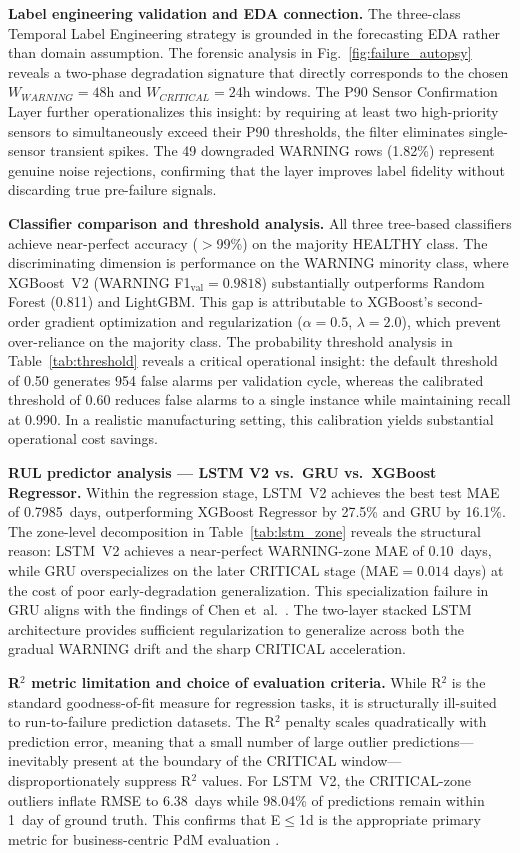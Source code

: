 \documentclass[conference]{IEEEtran}
\begin{document}
\textbf{Label engineering validation and EDA connection.} The three-class Temporal Label Engineering strategy is grounded in the forecasting EDA rather than domain assumption. The forensic analysis in Fig.~\ref{fig:failure_autopsy} reveals a two-phase degradation signature that directly corresponds to the chosen $W_{WARNING}=48$h and $W_{CRITICAL}=24$h windows. The P90 Sensor Confirmation Layer further operationalizes this insight: by requiring at least two high-priority sensors to simultaneously exceed their P90 thresholds, the filter eliminates single-sensor transient spikes. The 49 downgraded WARNING rows (1.82\%) represent genuine noise rejections, confirming that the layer improves label fidelity without discarding true pre-failure signals.

\textbf{Classifier comparison and threshold analysis.} All three tree-based classifiers achieve near-perfect accuracy ($>$99\%) on the majority HEALTHY class. The discriminating dimension is performance on the WARNING minority class, where XGBoost~V2 (WARNING F1$_\text{val}=0.9818$) substantially outperforms Random Forest (0.811) and LightGBM. This gap is attributable to XGBoost's second-order gradient optimization and regularization ($\alpha=0.5$, $\lambda=2.0$), which prevent over-reliance on the majority class. The probability threshold analysis in Table~\ref{tab:threshold} reveals a critical operational insight: the default threshold of 0.50 generates 954 false alarms per validation cycle, whereas the calibrated threshold of 0.60 reduces false alarms to a single instance while maintaining recall at 0.990. In a realistic manufacturing setting, this calibration yields substantial operational cost savings.

\textbf{RUL predictor analysis — LSTM V2 vs.\ GRU vs.\ XGBoost Regressor.} Within the regression stage, LSTM~V2 achieves the best test MAE of 0.7985~days, outperforming XGBoost Regressor by 27.5\% and GRU by 16.1\%. The zone-level decomposition in Table~\ref{tab:lstm_zone} reveals the structural reason: LSTM~V2 achieves a near-perfect WARNING-zone MAE of 0.10~days, while GRU overspecializes on the later CRITICAL stage (MAE$=0.014$ days) at the cost of poor early-degradation generalization. This specialization failure in GRU aligns with the findings of Chen et~al.\ \cite{cho2014gru}. The two-layer stacked LSTM architecture provides sufficient regularization to generalize across both the gradual WARNING drift and the sharp CRITICAL acceleration.

\textbf{R$^2$ metric limitation and choice of evaluation criteria.} While R$^2$ is the standard goodness-of-fit measure for regression tasks, it is structurally ill-suited to run-to-failure prediction datasets. The R$^2$ penalty scales quadratically with prediction error, meaning that a small number of large outlier predictions---inevitably present at the boundary of the CRITICAL window---disproportionately suppress R$^2$ values. For LSTM~V2, the CRITICAL-zone outliers inflate RMSE to 6.38~days while 98.04\% of predictions remain within 1~day of ground truth. This confirms that E$\leq$1d is the appropriate primary metric for business-centric PdM evaluation \cite{hyndman2018forecasting}.
\end{document}
